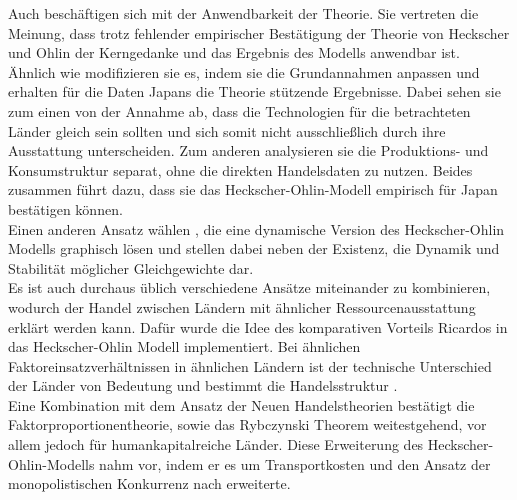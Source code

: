 %
Auch \cite{Davis.1995} beschäftigen sich mit der Anwendbarkeit der Theorie. Sie vertreten die Meinung, dass trotz fehlender empirischer Bestätigung der Theorie von Heckscher und Ohlin der Kerngedanke und das Ergebnis des Modells anwendbar ist. Ähnlich wie \cite{Trefler.1993} modifizieren sie es, indem sie die Grundannahmen anpassen und erhalten für die Daten Japans die Theorie stützende Ergebnisse. Dabei sehen sie zum einen von der Annahme ab, dass die Technologien für die betrachteten Länder gleich sein sollten und sich somit nicht ausschließlich durch ihre Ausstattung unterscheiden. Zum anderen analysieren sie die Produktions- und Konsumstruktur separat, ohne die direkten Handelsdaten zu nutzen.  Beides zusammen führt dazu, dass sie das Heckscher-Ohlin-Modell empirisch für Japan bestätigen können.\\
%
Einen anderen Ansatz wählen \cite{Bond.}, die eine dynamische Version des Heckscher-Ohlin Modells graphisch lösen und stellen dabei neben der Existenz, die Dynamik und Stabilität möglicher Gleichgewichte dar.\\
%
Es ist auch durchaus üblich verschiedene Ansätze miteinander zu kombinieren, wodurch der Handel zwischen Ländern mit ähnlicher Ressourcenausstattung erklärt werden kann. Dafür wurde die Idee des komparativen Vorteils Ricardos in das Heckscher-Ohlin Modell implementiert. Bei ähnlichen Faktoreinsatzverhältnissen in ähnlichen Ländern ist der technische Unterschied der Länder von Bedeutung und bestimmt die Handelsstruktur \cite{Davis.1995b}.\\
%
Eine Kombination mit dem Ansatz der Neuen Handelstheorien bestätigt die Faktorproportionentheorie, sowie das Rybczynski Theorem weitestgehend, vor allem jedoch für humankapitalreiche Länder. Diese Erweiterung des Heckscher-Ohlin-Modells nahm \cite{Romalis.2004} vor, indem er es um Transportkosten und den Ansatz der monopolistischen Konkurrenz nach \cite{Krugman.1980} erweiterte.\\
%
